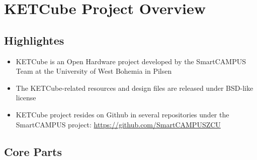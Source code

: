 \section{KETCube Project Overview}
\subsection{Highlightes}

\begin{frame}%
  \begin{itemize}
    \item KETCube is an Open Hardware project developed by the SmartCAMPUS Team at the University of West Bohemia in Pilsen
    \item The KETCube-related resources and design files are released under BSD-like license
    \item KETCube project resides on Github in several repositories under the SmartCAMPUS project: \url{https://github.com/SmartCAMPUSZCU}
  \end{itemize}
  
\end{frame}

\subsection{Core Parts}

